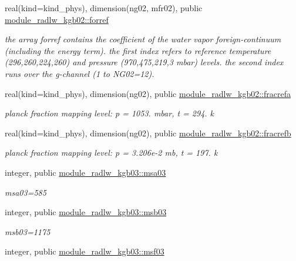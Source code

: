 \begin{DoxyCompactItemize}
real(kind=kind\+\_\+phys), dimension(ng02, mfr02), public \hyperlink{group__module__radlw__kgbnn_gaf6f3d7a0ab6858eab9d4d3e2d2d68031}{module\+\_\+radlw\+\_\+kgb02\+::forref}
\begin{DoxyCompactList}\small\item\em the array forref contains the coefficient of the water vapor foreign-\/continuum (including the energy term). the first index refers to reference temperature (296,260,224,260) and pressure (970,475,219,3 mbar) levels. the second index runs over the g-\/channel (1 to N\+G02=12). \end{DoxyCompactList}\item 
real(kind=kind\+\_\+phys), dimension(ng02), public \hyperlink{group__module__radlw__kgbnn_gaf6db1580bd4a8b037cdd3e14765e2c83}{module\+\_\+radlw\+\_\+kgb02\+::fracrefa}
\begin{DoxyCompactList}\small\item\em planck fraction mapping level\+: p = 1053. mbar, t = 294. k \end{DoxyCompactList}\item 
real(kind=kind\+\_\+phys), dimension(ng02), public \hyperlink{group__module__radlw__kgbnn_gaeedda30c8d2bd7c9e7124c6445c8c20e}{module\+\_\+radlw\+\_\+kgb02\+::fracrefb}
\begin{DoxyCompactList}\small\item\em planck fraction mapping level\+: p = 3.\+206e-\/2 mb, t = 197. k \end{DoxyCompactList}\item 
\mbox{\label{namespacemodule__radlw__kgb03_a78658032153f7a4cbeaa198cbe661244}} 
integer, public \hyperlink{namespacemodule__radlw__kgb03_a78658032153f7a4cbeaa198cbe661244}{module\+\_\+radlw\+\_\+kgb03\+::msa03}
\begin{DoxyCompactList}\small\item\em msa03=585 \end{DoxyCompactList}\item 
integer, public \hyperlink{group__module__radlw__kgbnn_gac57ba9584cbc3a5e4e2e0a6b548d21e9}{module\+\_\+radlw\+\_\+kgb03\+::msb03}
\begin{DoxyCompactList}\small\item\em msb03=1175 \end{DoxyCompactList}\item 
integer, public \hyperlink{group__module__radlw__kgbnn_gaf553bb46aa3ea6bcbb945cb2c2778955}{module\+\_\+radlw\+\_\+kgb03\+::msf03}

\end{DoxyCompactItemize}
